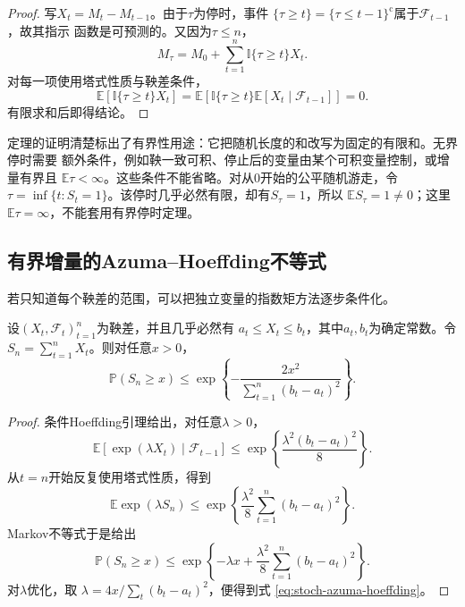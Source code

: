 \begin{proof}
写$X_t=M_t-M_{t-1}$。由于$\tau$为停时，事件
$\{\tau\geq t\}=\{\tau\leq t-1\}^{\mathrm{c}}$属于$\mathcal{F}_{t-1}$，故其指示
函数是可预测的。又因为$\tau\leq n$，
\[
  M_\tau
  =
  M_0+\sum_{t=1}^{n}\mathbb{I}\{\tau\geq t\}X_t.
\]
对每一项使用塔式性质与鞅差条件，
\[
  \mathbb{E}\!\left[
    \mathbb{I}\{\tau\geq t\}X_t
  \right]
  =
  \mathbb{E}\!\left[
    \mathbb{I}\{\tau\geq t\}
    \mathbb{E}[X_t\mid\mathcal{F}_{t-1}]
  \right]
  =0.
\]
有限求和后即得结论。
\end{proof}

定理的证明清楚标出了有界性用途：它把随机长度的和改写为固定的有限和。无界停时需要
额外条件，例如鞅一致可积、停止后的变量由某个可积变量控制，或增量有界且
$\mathbb{E}\tau<\infty$。这些条件不能省略。对从$0$开始的公平随机游走，令
$\tau=\inf\{t:S_t=1\}$。该停时几乎必然有限，却有$S_\tau=1$，所以
$\mathbb{E}S_\tau=1\neq0$；这里$\mathbb{E}\tau=\infty$，不能套用有界停时定理。

\subsection{有界增量的Azuma--Hoeffding不等式}

若只知道每个鞅差的范围，可以把独立变量的指数矩方法逐步条件化。

\begin{theorem}
  \label{thm:stoch-azuma-hoeffding}
  设$(X_t,\mathcal{F}_t)_{t=1}^{n}$为鞅差，并且几乎必然有
  $a_t\leq X_t\leq b_t$，其中$a_t,b_t$为确定常数。令
  $S_n=\sum_{t=1}^{n}X_t$。则对任意$x>0$，
  \begin{equation}
    \mathbb{P}(S_n\geq x)\leq\exp\left\{
      -\frac{2x^2}{\sum_{t=1}^{n}(b_t-a_t)^2}
    \right\}.
    \label{eq:stoch-azuma-hoeffding}
  \end{equation}
\end{theorem}

\begin{proof}
条件Hoeffding引理给出，对任意$\lambda>0$，
\[
  \mathbb{E}[
    \exp(\lambda X_t)
    \mid\mathcal{F}_{t-1}]
  \leq
  \exp\left\{
    \frac{\lambda^2(b_t-a_t)^2}{8}
  \right\}.
\]
从$t=n$开始反复使用塔式性质，得到
\[
  \mathbb{E}\exp(\lambda S_n)
  \leq
  \exp\left\{
    \frac{\lambda^2}{8}
    \sum_{t=1}^{n}(b_t-a_t)^2
  \right\}.
\]
Markov不等式于是给出
\[
  \mathbb{P}(S_n\geq x)
  \leq
  \exp\left\{
    -\lambda x+
    \frac{\lambda^2}{8}
    \sum_{t=1}^{n}(b_t-a_t)^2
  \right\}.
\]
对$\lambda$优化，取
$\lambda=4x/\sum_t(b_t-a_t)^2$，便得到式
\eqref{eq:stoch-azuma-hoeffding}。
\end{proof}

